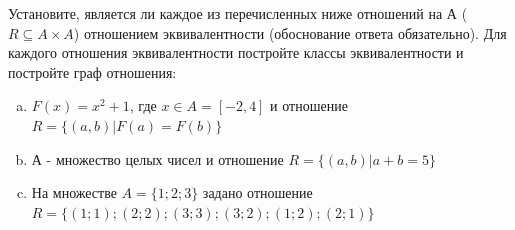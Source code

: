 \question
Установите, является ли каждое из перечисленных ниже отношений на А ($R \subseteq A \times A$) отношением эквивалентности (обоснование ответа обязательно). Для каждого отношения эквивалентности постройте классы эквивалентности и постройте граф отношения:
\begin{enumerate} [a)]\setcounter{enumi}{0}
\item $F(x)=x^{2}+1$, где $x \in A = [-2, 4]$ и отношение $R = \{(a,b)|F(a) = F(b)\}$
\item А - множество целых чисел и отношение $R = \{(a,b)|a + b = 5\}$
\item На множестве $A = \{1; 2; 3\}$ задано отношение $R = \{(1; 1); (2; 2); (3; 3); (3; 2); (1; 2); (2; 1)\}$

\end{enumerate}